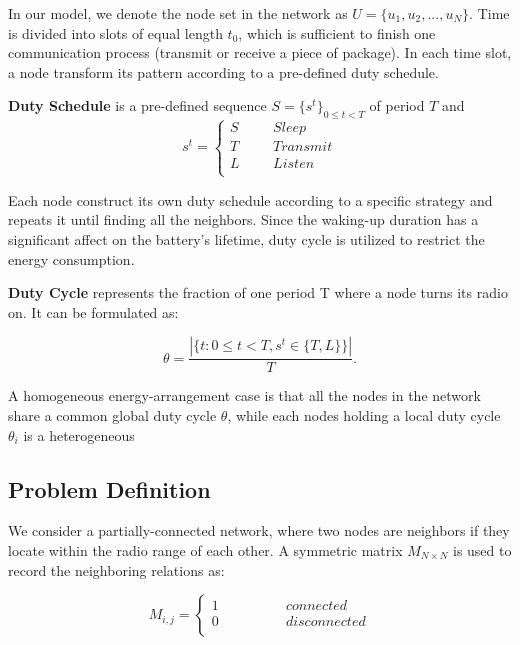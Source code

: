 In our model, we denote the node set in the network as $U = \{u_1,u_2,...,u_N\}$.
Time is divided into slots of equal length $t_0$, 
which is sufficient to finish  one communication process
(transmit or receive a piece of package). In each time slot, 
a node transform its pattern according to a pre-defined duty schedule.


\begin{definition}
\textbf{Duty Schedule} is a pre-defined sequence $S=\{s^t\}_{0\leq t<T}$ of period $T$ and
$$ s^t=\left\{
\begin{aligned}
S  & & & {Sleep}\\
T  & & & {Transmit}\\
L  & & & {Listen}\\
\end{aligned}
\right.
$$
\end{definition}

 Each node construct its own duty schedule according to a specific strategy and repeats it
 until finding all the neighbors. Since the waking-up duration has a significant affect on the battery's lifetime, 
 duty cycle is utilized to restrict the energy consumption.

\begin{definition}
\textbf{Duty Cycle} represents the fraction of one period T where a node turns its radio on. It can be formulated as:

$$\theta=\frac{|\{t: 0\leq t<T, s^t \in \{T,L\}\}|}{T}.
$$
  
\end{definition}

A homogeneous energy-arrangement case is that all the nodes
in the network share a common global duty cycle $\theta$,
while each nodes holding a local duty cycle $\theta_i$ is 
a heterogeneous


\subsection{Problem Definition}

We consider a partially-connected network, 
where two nodes are neighbors if they locate within the radio range of each other. 
A  symmetric matrix $M_{N\times N}$ is used to record the neighboring relations as:

$$ M_{i,j}=\left\{
\begin{aligned}
1  & & & & & & {connected}\\
0  & & & & & & {disconnected}\\
\end{aligned}
\right.
$$

